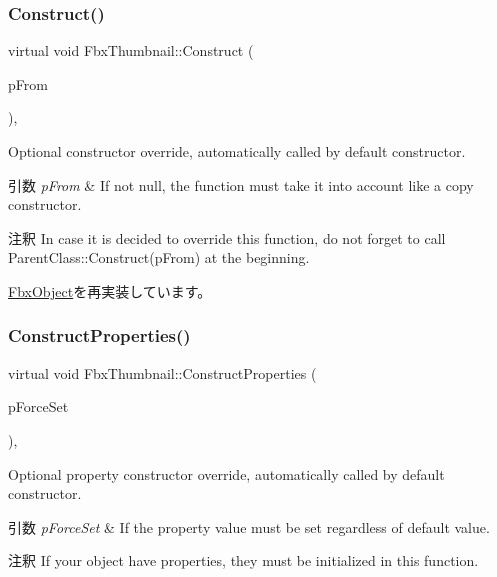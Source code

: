 \subsubsection{\texorpdfstring{Construct()}{Construct()}}
{\footnotesize\ttfamily virtual void Fbx\+Thumbnail\+::\+Construct (\begin{DoxyParamCaption}\item[{const \hyperlink{class_fbx_object}{Fbx\+Object} $\ast$}]{p\+From }\end{DoxyParamCaption})\hspace{0.3cm}{\ttfamily [protected]}, {\ttfamily [virtual]}}

Optional constructor override, automatically called by default constructor. 
\begin{DoxyParams}{引数}
{\em p\+From} & If not null, the function must take it into account like a copy constructor. \\
\hline
\end{DoxyParams}
\begin{DoxyRemark}{注釈}
In case it is decided to override this function, do not forget to call Parent\+Class\+::\+Construct(p\+From) at the beginning. 
\end{DoxyRemark}


\hyperlink{class_fbx_object_a313503bc645af3fdceb4a99ef5cea7eb}{Fbx\+Object}を再実装しています。

\mbox{\label{class_fbx_thumbnail_ac846023b70cdbab67f477109752bfb0d}} 
\subsubsection{\texorpdfstring{Construct\+Properties()}{ConstructProperties()}}
{\footnotesize\ttfamily virtual void Fbx\+Thumbnail\+::\+Construct\+Properties (\begin{DoxyParamCaption}\item[{bool}]{p\+Force\+Set }\end{DoxyParamCaption})\hspace{0.3cm}{\ttfamily [protected]}, {\ttfamily [virtual]}}

Optional property constructor override, automatically called by default constructor. 
\begin{DoxyParams}{引数}
{\em p\+Force\+Set} & If the property value must be set regardless of default value. \\
\hline
\end{DoxyParams}
\begin{DoxyRemark}{注釈}
If your object have properties, they must be initialized in this function. 
\end{DoxyRemark}


